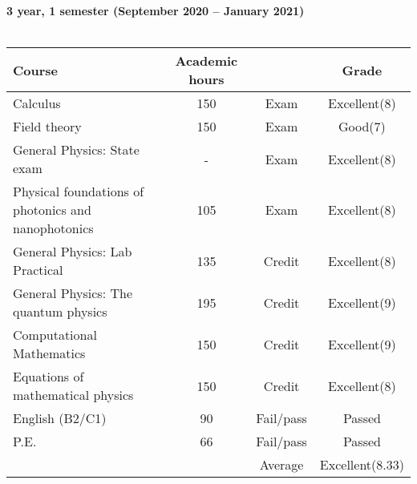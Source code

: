 \documentclass[a4paper]{article}
\newcommand{\upperRomannumeral}[1]{\uppercase\expandafter{\romannumeral#1}}
\begin{document}
\textbf{3 year, 1 semester (September 2020 -- January 2021)}\\ \\
\begin{tabular}{|p{6cm}|c|c|c|}
\hline
\textbf{Course}&\textbf{Academic hours}& &\textbf{Grade}\\
\hline
Calculus \upperRomannumeral{5} & 150 & Exam & Excellent(8)\\

Field theory & 150 & Exam & Good(7)\\

General Physics: State exam & - & Exam & Excellent(8)\\

Physical foundations of photonics and nanophotonics & 105 & Exam & Excellent(8)\\

General Physics: Lab Practical & 135 & Credit & Excellent(8)\\

General Physics: The quantum physics & 195 & Credit & Excellent(9)\\

Computational Mathematics & 150 & Credit & Excellent(9) \\

Equations of mathematical physics & 150 & Credit & Excellent(8) \\

English (B2/C1) & 90 & Fail/pass & Passed\\

P.E.& 66 & Fail/pass & Passed \\
\hline
&& Average & Excellent(8.33)\\
\hline
\end{tabular}\\ \\
\end{document}
